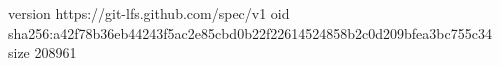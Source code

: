 version https://git-lfs.github.com/spec/v1
oid sha256:a42f78b36eb44243f5ac2e85cbd0b22f22614524858b2c0d209bfea3bc755c34
size 208961
